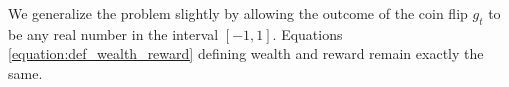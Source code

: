 We generalize the problem slightly by allowing the outcome of the coin flip
$g_t$ to be any real number in the interval $[-1,1]$.  Equations
\eqref{equation:def_wealth_reward} defining wealth and reward remain exactly
the same.
